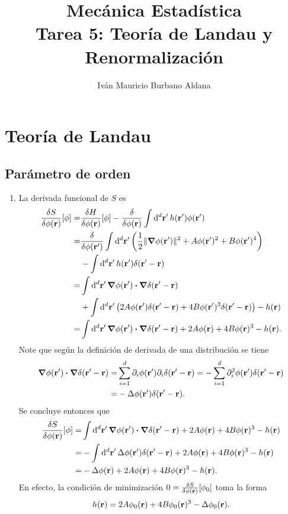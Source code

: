 \documentclass{article}
\title{Mecánica Estadística\\Tarea 5: Teoría de Landau y Renormalización}
\author{Iván Mauricio Burbano Aldana}
\begin{document}
\maketitle

\section{Teoría de Landau}

\subsection{Parámetro de orden}

\begin{enumerate}

\item La derivada funcional de $S$ es
\begin{align}
\begin{split}
\fdv{S}{\phi(\vb{r})}[\phi]=&\fdv{H}{\phi(\vb{r})}[\phi]-\fdv{\phi(\vb{r})}\int \dd[d]{\vb{r'}} h(\vb{r'})\phi(\vb{r'})\\
=&\fdv{\phi(\vb{r'})}\int\dd[d]{\vb{r'}}\qty(\frac{1}{2}\|\grad{\phi}(\vb{r'})\|^2+A\phi(\vb{r'})^2+B\phi(\vb{r'})^4)\\
&-\int\dd[d]{\vb{r'}}h(\vb{r'})\delta(\vb{r'}-\vb{r})\\
=&\int\dd[d]{\vb{r'}}\grad{\phi}(\vb{r'})\vdot\grad{\delta}(\vb{r'}-\vb{r})\\
&+\int\dd[d]{\vb{r'}}\qty(2A\phi(\vb{r'})\delta(\vb{r'}-\vb{r})+4B\phi(\vb{r'})^3\delta(\vb{r'}-\vb{r}))-h(\vb{r})\\
=&\int\dd[d]{\vb{r'}}\grad{\phi}(\vb{r'})\vdot\grad{\delta}(\vb{r'}-\vb{r})+2A\phi(\vb{r})+4B\phi(\vb{r})^3-h(\vb{r}).
\end{split}
\end{align}
Note que según la definición de derivada de una distribución se tiene
\begin{align}
\begin{split}
\grad{\phi}(\vb{r'})\vdot\grad{\delta}(\vb{r'}-\vb{r})=&\sum_{i=1}^d\partial_i\phi(\vb{r'})\partial_i{\delta}(\vb{r'}-\vb{r})=-\sum_{i=1}^d\partial_i^2\phi(\vb{r'})\delta(\vb{r'}-\vb{r})\\
=&-\Delta\phi(\vb{r'})\delta(\vb{r'}-\vb{r}).
\end{split}
\end{align}
Se concluye entonces que
\begin{align}
\begin{split}
\fdv{S}{\phi(\vb{r})}[\phi]=&\int\dd[d]{\vb{r'}}\grad{\phi}(\vb{r'})\vdot\grad{\delta}(\vb{r'}-\vb{r})+2A\phi(\vb{r})+4B\phi(\vb{r})^3-h(\vb{r})\\
=&-\int\dd[d]{\vb{r'}}\Delta\phi(\vb{r'})\delta(\vb{r'}-\vb{r})+2A\phi(\vb{r})+4B\phi(\vb{r})^3-h(\vb{r})\\
=&-\Delta\phi(\vb{r})+2A\phi(\vb{r})+4B\phi(\vb{r})^3-h(\vb{r}).
\end{split}
\end{align}
En efecto, la condición de minimización $0=\fdv{S}{\phi(\vb{r})}[\phi_0]$ toma la forma
\begin{equation}
h(\vb{r})=2A\phi_0(\vb{r})+4B\phi_0(\vb{r})^3-\Delta\phi_0(\vb{r}).
\end{equation}


\end{enumerate}
\end{document}
